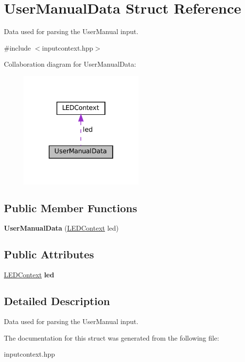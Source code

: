 \hypertarget{structUserManualData}{}\section{User\+Manual\+Data Struct Reference}
\label{structUserManualData}


Data used for parsing the User\+Manual input.  




{\ttfamily \#include $<$inputcontext.\+hpp$>$}



Collaboration diagram for User\+Manual\+Data\+:\nopagebreak
\begin{figure}[H]
\begin{center}
\leavevmode
\includegraphics[width=178pt]{structUserManualData__coll__graph}
\end{center}
\end{figure}
\subsection*{Public Member Functions}
\begin{DoxyCompactItemize}
\item 
\mbox{\label{structUserManualData_a598240dc298cc519dffc1a73c9c911cb}} 
{\bfseries User\+Manual\+Data} (\hyperlink{classLEDContext}{L\+E\+D\+Context} led)
\end{DoxyCompactItemize}
\subsection*{Public Attributes}
\begin{DoxyCompactItemize}
\item 
\mbox{\label{structUserManualData_aec74f70aeef43227b6b1a494333687df}} 
\hyperlink{classLEDContext}{L\+E\+D\+Context} {\bfseries led}
\end{DoxyCompactItemize}


\subsection{Detailed Description}
Data used for parsing the User\+Manual input. 

The documentation for this struct was generated from the following file\+:\begin{DoxyCompactItemize}
\item 
inputcontext.\+hpp\end{DoxyCompactItemize}
